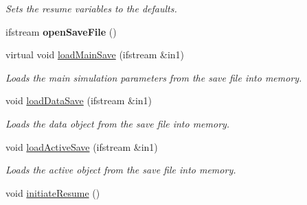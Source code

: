 \begin{DoxyCompactItemize}
\begin{DoxyCompactList}\small\item\em Sets the resume variables to the defaults. \end{DoxyCompactList}\item 
ifstream {\bfseries open\+Save\+File} ()\hypertarget{class_tree_ad0093ade6fd9c47c35b309010cfdf62f}{}\label{class_tree_ad0093ade6fd9c47c35b309010cfdf62f}

\item 
virtual void \hyperlink{class_tree_adbebd341b5d4c2c7685c728a2cb46a61}{load\+Main\+Save} (ifstream \&in1)\hypertarget{class_tree_adbebd341b5d4c2c7685c728a2cb46a61}{}\label{class_tree_adbebd341b5d4c2c7685c728a2cb46a61}

\begin{DoxyCompactList}\small\item\em Loads the main simulation parameters from the save file into memory. \end{DoxyCompactList}\item 
void \hyperlink{class_tree_ac6483904c8b94797fdb4c51fed39a2ac}{load\+Data\+Save} (ifstream \&in1)\hypertarget{class_tree_ac6483904c8b94797fdb4c51fed39a2ac}{}\label{class_tree_ac6483904c8b94797fdb4c51fed39a2ac}

\begin{DoxyCompactList}\small\item\em Loads the data object from the save file into memory. \end{DoxyCompactList}\item 
void \hyperlink{class_tree_a2fa8cf49a891654ff9316460ba6d9991}{load\+Active\+Save} (ifstream \&in1)\hypertarget{class_tree_a2fa8cf49a891654ff9316460ba6d9991}{}\label{class_tree_a2fa8cf49a891654ff9316460ba6d9991}

\begin{DoxyCompactList}\small\item\em Loads the active object from the save file into memory. \end{DoxyCompactList}\item 
void \hyperlink{class_tree_a8cfe5d30d53d702f18cd67981e2c9acb}{initiate\+Resume} ()\hypertarget{class_tree_a8cfe5d30d53d702f18cd67981e2c9acb}{}\label{class_tree_a8cfe5d30d53d702f18cd67981e2c9acb}


\end{DoxyCompactItemize}

